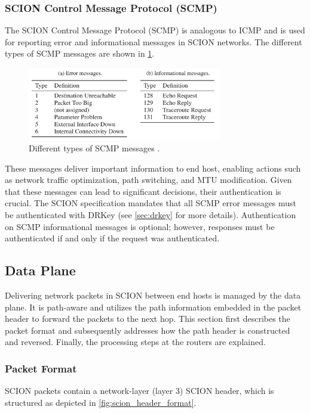 \subsubsection{SCION Control Message Protocol (SCMP)}


The SCION Control Message Protocol (SCMP) is analogous to ICMP and is used for reporting error and informational messages in SCION networks.
The different types of SCMP messages are shown in \cref{fig:scmp_message_types}.

\begin{figure}[h]
    \centering
    \includegraphics[width=0.75\textwidth]{figures/scmp_message_types.png}
\caption{Different types of SCMP messages \cite[Section 4.7.2]{Perrig2022}.}
    \label{fig:scmp_message_types}
\end{figure}

These messages deliver important information to end host, enabling actions such as network traffic optimization, path switching, and MTU modification.
Given that these messages can lead to significant decisions, their authentication is crucial.
The SCION specification mandates that all SCMP error messages must be authenticated with DRKey (see \cref{sec:drkey} for more details).
Authentication on SCMP informational messages is optional; however, responses must be authenticated if and only if the request was authenticated.

\newpage
\subsection{Data Plane}
Delivering network packets in SCION between end hosts is managed by the data plane.
It is path-aware and utilizes the path information embedded in the packet header to forward the packets to the next hop.
This section first describes the packet format and subsequently addresses how the path header is constructed and reversed.
Finally, the processing steps at the routers are explained.

\subsubsection{Packet Format}
SCION packets contain a network-layer (layer 3) SCION header, which is structured as depicted in \cref{fig:scion_header_format}.

